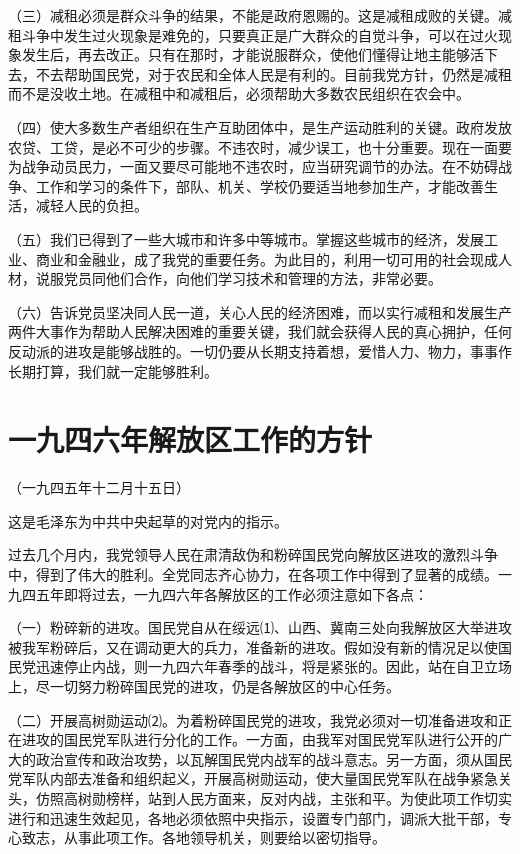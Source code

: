 \documentclass[UTF-8, a5paper, 12pt]{ctexart}
\begin{document}
（三）减租必须是群众斗争的结果，不能是政府恩赐的。这是减租成败的关键。减租斗争中发生过火现象是难免的，只要真正是广大群众的自觉斗争，可以在过火现象发生后，再去改正。只有在那时，才能说服群众，使他们懂得让地主能够活下去，不去帮助国民党，对于农民和全体人民是有利的。目前我党方针，仍然是减租而不是没收土地。在减租中和减租后，必须帮助大多数农民组织在农会中。

（四）使大多数生产者组织在生产互助团体中，是生产运动胜利的关键。政府发放农贷、工贷，是必不可少的步骤。不违农时，减少误工，也十分重要。现在一面要为战争动员民力，一面又要尽可能地不违农时，应当研究调节的办法。在不妨碍战争、工作和学习的条件下，部队、机关、学校仍要适当地参加生产，才能改善生活，减轻人民的负担。

（五）我们已得到了一些大城市和许多中等城市。掌握这些城市的经济，发展工业、商业和金融业，成了我党的重要任务。为此目的，利用一切可用的社会现成人材，说服党员同他们合作，向他们学习技术和管理的方法，非常必要。

（六）告诉党员坚决同人民一道，关心人民的经济困难，而以实行减租和发展生产两件大事作为帮助人民解决困难的重要关键，我们就会获得人民的真心拥护，任何反动派的进攻是能够战胜的。一切仍要从长期支持着想，爱惜人力、物力，事事作长期打算，我们就一定能够胜利。 
\section{一九四六年解放区工作的方针}

（一九四五年十二月十五日）

这是毛泽东为中共中央起草的对党内的指示。

过去几个月内，我党领导人民在肃清敌伪和粉碎国民党向解放区进攻的激烈斗争中，得到了伟大的胜利。全党同志齐心协力，在各项工作中得到了显著的成绩。一九四五年即将过去，一九四六年各解放区的工作必须注意如下各点：

（一）粉碎新的进攻。国民党自从在绥远⑴、山西、冀南三处向我解放区大举进攻被我军粉碎后，又在调动更大的兵力，准备新的进攻。假如没有新的情况足以使国民党迅速停止内战，则一九四六年春季的战斗，将是紧张的。因此，站在自卫立场上，尽一切努力粉碎国民党的进攻，仍是各解放区的中心任务。

（二）开展高树勋运动⑵。为着粉碎国民党的进攻，我党必须对一切准备进攻和正在进攻的国民党军队进行分化的工作。一方面，由我军对国民党军队进行公开的广大的政治宣传和政治攻势，以瓦解国民党内战军的战斗意志。另一方面，须从国民党军队内部去准备和组织起义，开展高树勋运动，使大量国民党军队在战争紧急关头，仿照高树勋榜样，站到人民方面来，反对内战，主张和平。为使此项工作切实进行和迅速生效起见，各地必须依照中央指示，设置专门部门，调派大批干部，专心致志，从事此项工作。各地领导机关，则要给以密切指导。
\end{document}
